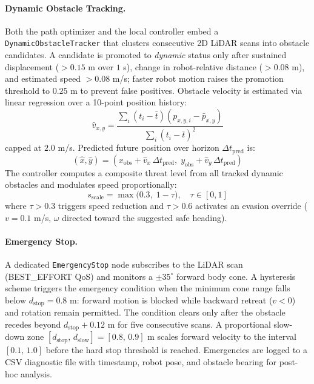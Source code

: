 \documentclass[pdflatex,sn-nature]{sn-jnl}%
\begin{document}
\paragraph{Dynamic Obstacle Tracking.}
Both the path optimizer and the local controller embed a \texttt{DynamicObstacleTracker} that clusters consecutive 2D LiDAR scans into obstacle candidates. A candidate is promoted to \emph{dynamic} status only after sustained displacement ($> 0.15$ m over $1$ s), change in robot-relative distance ($> 0.08$ m), and estimated speed $> 0.08$ m/s; faster robot motion raises the promotion threshold to $0.25$ m to prevent false positives. Obstacle velocity is estimated via linear regression over a 10-point position history:
\begin{equation}
\hat{v}_{x,y} = \frac{\sum_i (t_i - \bar{t})(p_{x,y,i} - \bar{p}_{x,y})}{\sum_i (t_i - \bar{t})^2}
\label{eq:obs_velocity}
\end{equation}
capped at $2.0$ m/s. Predicted future position over horizon $\Delta t_{\mathrm{pred}}$ is:
\begin{equation}
(\hat{x}, \hat{y}) = (x_{\mathrm{obs}} + \hat{v}_x\,\Delta t_{\mathrm{pred}},\; y_{\mathrm{obs}} + \hat{v}_y\,\Delta t_{\mathrm{pred}})
\label{eq:obs_predict}
\end{equation}
The controller computes a composite threat level from all tracked dynamic obstacles and modulates speed proportionally:
\begin{equation}
s_{\mathrm{scale}} = \max\!\bigl(0.3,\; 1 - \tau\bigr), \quad \tau \in [0,1]
\label{eq:speed_scale_threat}
\end{equation}
where $\tau > 0.3$ triggers speed reduction and $\tau > 0.6$ activates an evasion override ($v = 0.1$ m/s, $\omega$ directed toward the suggested safe heading).

\paragraph{Emergency Stop.}
A dedicated \texttt{EmergencyStop} node subscribes to the LiDAR scan (BEST\_EFFORT QoS) and monitors a $\pm 35^\circ$ forward body cone. A hysteresis scheme triggers the emergency condition when the minimum cone range falls below $d_{\mathrm{stop}} = 0.8$ m: forward motion is blocked while backward retreat ($v < 0$) and rotation remain permitted. The condition clears only after the obstacle recedes beyond $d_{\mathrm{stop}} + 0.12$ m for five consecutive scans. A proportional slow-down zone $[d_{\mathrm{stop}},\, d_{\mathrm{slow}}] = [0.8,\, 0.9]$ m scales forward velocity to the interval $[0.1,\, 1.0]$ before the hard stop threshold is reached. Emergencies are logged to a CSV diagnostic file with timestamp, robot pose, and obstacle bearing for post-hoc analysis.
\end{document}

